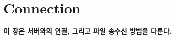 
\graphicspath{{./chap2/images/}}
\chapter{Connection}
  
\textbf{이 장은 서버와의 연결, 그리고 파일 송수신 방법을 다룬다.}